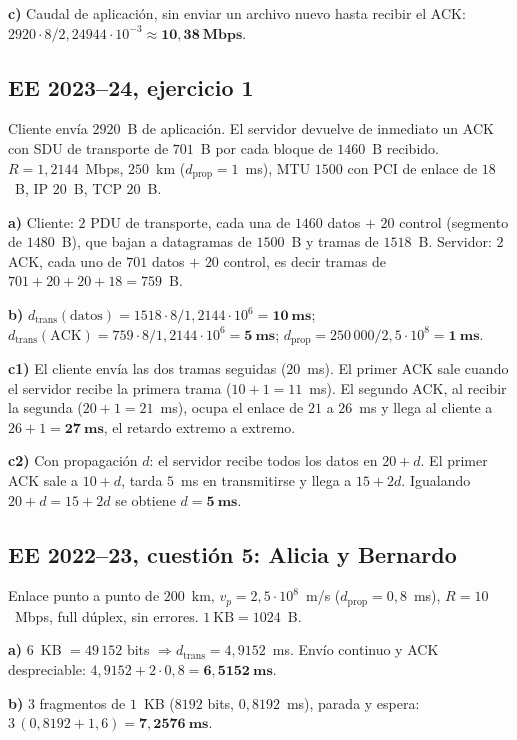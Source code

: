 \documentclass[11pt,a4paper]{article}
\begin{document}
\textbf{c)} Caudal de aplicación, sin enviar un archivo nuevo hasta recibir el ACK: $2920\cdot8/2{,}24944\cdot10^{-3}\approx\mathbf{10{,}38~Mbps}$.

\subsection*{EE 2023--24, ejercicio 1}
Cliente envía $2920$~B de aplicación. El servidor devuelve de inmediato un ACK con SDU de transporte de $701$~B por cada bloque de $1460$~B recibido. $R=1{,}2144$~Mbps, $250$~km ($d_{\text{prop}}=1$~ms), MTU $1500$ con PCI de enlace de $18$~B, IP $20$~B, TCP $20$~B.

\textbf{a)} Cliente: $2$ PDU de transporte, cada una de $1460$ datos $+$ $20$ control (segmento de $1480$~B), que bajan a datagramas de $1500$~B y tramas de $1518$~B. Servidor: $2$ ACK, cada uno de $701$ datos $+$ $20$ control, es decir tramas de $701+20+20+18=759$~B.

\textbf{b)} $d_{\text{trans}}(\text{datos})=1518\cdot8/1{,}2144\cdot10^{6}=\mathbf{10~ms}$; $d_{\text{trans}}(\text{ACK})=759\cdot8/1{,}2144\cdot10^{6}=\mathbf{5~ms}$; $d_{\text{prop}}=250\,000/2{,}5\cdot10^{8}=\mathbf{1~ms}$.

\textbf{c1)} El cliente envía las dos tramas seguidas ($20$~ms). El primer ACK sale cuando el servidor recibe la primera trama ($10+1=11$~ms). El segundo ACK, al recibir la segunda ($20+1=21$~ms), ocupa el enlace de $21$ a $26$~ms y llega al cliente a $26+1=\mathbf{27~ms}$, el retardo extremo a extremo.

\textbf{c2)} Con propagación $d$: el servidor recibe todos los datos en $20+d$. El primer ACK sale a $10+d$, tarda $5$~ms en transmitirse y llega a $15+2d$. Igualando $20+d=15+2d$ se obtiene $d=\mathbf{5~ms}$.

\subsection*{EE 2022--23, cuestión 5: Alicia y Bernardo}
Enlace punto a punto de $200$~km, $v_p=2{,}5\cdot10^{8}$~m/s ($d_{\text{prop}}=0{,}8$~ms), $R=10$~Mbps, full dúplex, sin errores. $1~\text{KB}=1024$~B.

\textbf{a)} $6$~KB $=49\,152$ bits $\Rightarrow d_{\text{trans}}=4{,}9152$~ms. Envío continuo y ACK despreciable: $4{,}9152+2\cdot0{,}8=\mathbf{6{,}5152~ms}$.

\textbf{b)} $3$ fragmentos de $1$~KB ($8192$ bits, $0{,}8192$~ms), parada y espera: $3\,(0{,}8192+1{,}6)=\mathbf{7{,}2576~ms}$.
\end{document}
